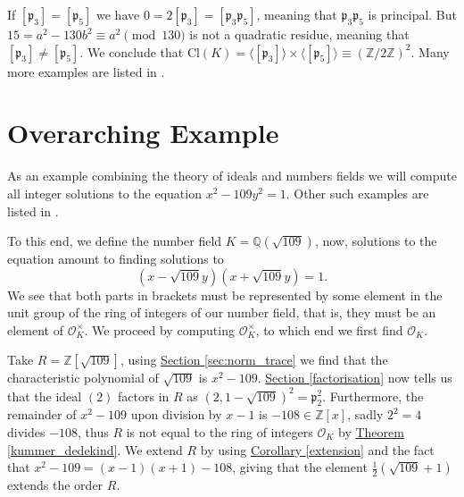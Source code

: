 \documentclass[openany, a4paper, 10pt]{book}
\theoremstyle{plain}
\theoremstyle{plain}
\theoremstyle{plain}
\theoremstyle{definition}
\theoremstyle{plain}
\theoremstyle{definition}
\theoremstyle{remark}
\newcommand{\theoref}[1]{\hyperref[#1]{Theorem \ref{#1}}}
\newcommand{\corref}[1]{\hyperref[#1]{Corollary \ref{#1}}}
\newcommand{\secref}[1]{\hyperref[#1]{Section \ref{#1}}}
\begin{document}
\begin{examplebox}
    If $[\mathfrak p_3] = [\mathfrak p_5]$ we have $0 = 2[\mathfrak p_3] = [\mathfrak p_3 \mathfrak p_5]$, meaning that $\mathfrak p_3 \mathfrak p_5$ is principal.
    But $15 = a^2-130b^2 \equiv a^2 \pmod {130}$ is not a quadratic residue, meaning that $[\mathfrak p_3] \neq [\mathfrak p_5]$.
    We conclude that $\mathrm{Cl}(K) = \langle [\mathfrak p_3] \rangle \times \langle [\mathfrak p_5] \rangle \equiv (\mathbb Z / 2 \mathbb Z)^2$.
    \tcbline
    Many more examples are listed in \cite[Ex.~2.1-2.6,3.1-3.4]{Conrad_class_group}.
\end{examplebox}


\section{Overarching Example}
As an example combining the theory of ideals and numbers fields we will compute all integer solutions to the equation $x^2-109 y^2 = 1$.
Other such examples are listed in \cite[\S~7]{ANT_dictaat}.

To this end, we define the number field $K = \mathbb Q(\sqrt{109})$, now, solutions to the equation amount to finding solutions to
$$(x-\sqrt{109}y)(x+\sqrt{109}y) = 1.$$
We see that both parts in brackets must be represented by some element in the unit group of the ring of integers of our number field, that is, they must be an element of $\mathcal O_K^\times$.
We proceed by computing $\mathcal O_K^\times$, to which end we first find $\mathcal O_K$.

Take $R = \mathbb Z[\sqrt{109}]$, using \secref{sec:norm_trace} we find that the characteristic polynomial of $\sqrt{109}$ is $x^2-109$.
\secref{factorisation} now tells us that the ideal $(2)$ factors in $R$ as $(2,1-\sqrt{109})^2 = \mathfrak p_2^2$.
Furthermore, the remainder of $x^2-109$ upon division by $x-1$ is $-108\in \mathbb Z[x]$,
sadly $2^2 = 4$ divides $-108$, thus $R$ is not equal to the ring of integers $\mathcal O_K$ by \theoref{kummer_dedekind}.
We extend $R$ by using \corref{extension} and the fact that $x^2-109 = (x-1)(x+1)-108$, giving that the element $\frac{1}{2}(\sqrt{109}+1)$ extends the order $R$.
\end{document}

